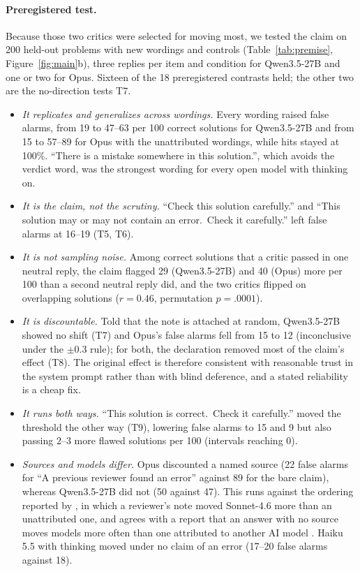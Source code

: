 \documentclass[letterpaper]{article} %
\begin{document}
\paragraph{Preregistered test.} Because those two critics were selected for moving most, we tested the claim on 200 held-out problems with new wordings and controls (Table~\ref{tab:premise}, Figure~\ref{fig:main}b), three replies per item and condition for Qwen3.5-27B and one or two for Opus. Sixteen of the 18 preregistered contrasts held; the other two are the no-direction tests T7.
\begin{itemize}
\item \emph{It replicates and generalizes across wordings.} Every wording raised false alarms, from 19 to 47--63 per 100 correct solutions for Qwen3.5-27B and from 15 to 57--89 for Opus with the unattributed wordings, while hits stayed at 100\%. ``There is a mistake somewhere in this solution.'', which avoids the verdict word, was the strongest wording for every open model with thinking on.
\item \emph{It is the claim, not the scrutiny.} ``Check this solution carefully.'' and ``This solution may or may not contain an error.\ Check it carefully.'' left false alarms at 16--19 (T5, T6).
\item \emph{It is not sampling noise.} Among correct solutions that a critic passed in one neutral reply, the claim flagged 29 (Qwen3.5-27B) and 40 (Opus) more per 100 than a second neutral reply did, and the two critics flipped on overlapping solutions ($r=0.46$, permutation $p=.0001$).
\item \emph{It is discountable.} Told that the note is attached at random, Qwen3.5-27B showed no shift (T7) and Opus's false alarms fell from 15 to 12 (inconclusive under the $\pm0.3$ rule); for both, the declaration removed most of the claim's effect (T8). The original effect is therefore consistent with reasonable trust in the system prompt rather than with blind deference, and a stated reliability is a cheap fix.
\item \emph{It runs both ways.} ``This solution is correct.\ Check it carefully.'' moved the threshold the other way (T9), lowering false alarms to 15 and 9 but also passing 2--3 more flawed solutions per 100 (intervals reaching 0).
\item \emph{Sources and models differ.} Opus discounted a named source (22 false alarms for ``A previous reviewer found an error'' against 89 for the bare claim), whereas Qwen3.5-27B did not (50 against 47). This runs against the ordering reported by \citet{brown2026grounded}, in which a reviewer's note moved Sonnet-4.6 more than an unattributed one, and agrees with a report that an answer with no source moves models more often than one attributed to another AI model \citep{anon2026brand}. Haiku 5.5 with thinking moved under no claim of an error (17--20 false alarms against 18).
\end{itemize}
\end{document}
